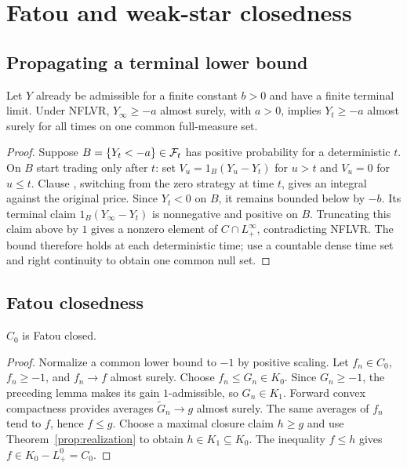\section{Fatou and weak-star closedness}\label{sec:fatou}
\subsection{Propagating a terminal lower bound}
\begin{lemma}\label{lem:terminal-running}
Let $Y$ already be admissible for a finite constant $b>0$ and have a finite
terminal limit. Under NFLVR, $Y_\infty\geq-a$ almost surely, with $a>0$,
implies $Y_t\geq-a$ almost surely for all times on one common full-measure set.
\end{lemma}
\begin{proof}
Suppose $B=\{Y_t<-a\}\in\mathcal F_t$ has positive probability for a deterministic $t$.
On $B$ start trading only after $t$: set $V_u=1_B(Y_u-Y_t)$ for $u>t$ and
$V_u=0$ for $u\leq t$. Clause , switching from the zero strategy at time $t$, gives an integral
against the original price. Since $Y_t<0$ on $B$, it remains bounded below
by $-b$. Its terminal claim $1_B(Y_\infty-Y_t)$ is nonnegative and positive
on $B$. Truncating this claim above by $1$ gives a nonzero element of
$C\cap L^\infty_+$, contradicting NFLVR. The bound therefore holds at each
deterministic time; use a countable dense time set and right continuity to
obtain one common null set.
\end{proof}

\subsection{Fatou closedness}
\begin{theorem}\label{thm:fatou}
$C_0$ is Fatou closed.
\end{theorem}
\begin{proof}
Normalize a common lower bound to $-1$ by positive scaling. Let $f_n\in C_0$,
$f_n\geq-1$, and $f_n\to f$ almost surely. Choose $f_n\leq G_n\in K_0$.
Since $G_n\geq-1$, the preceding lemma makes its gain $1$-admissible, so
$G_n\in K_1$. Forward convex compactness provides averages
$\widetilde G_n\to g$ almost surely. The same averages of $f_n$ tend to $f$,
hence $f\leq g$. Choose a maximal closure claim $h\geq g$ and use
Theorem~\ref{prop:realization} to obtain $h\in K_1\subseteq K_0$.
The inequality $f\leq h$ gives $f\in K_0-L^0_+=C_0$.
\end{proof}

